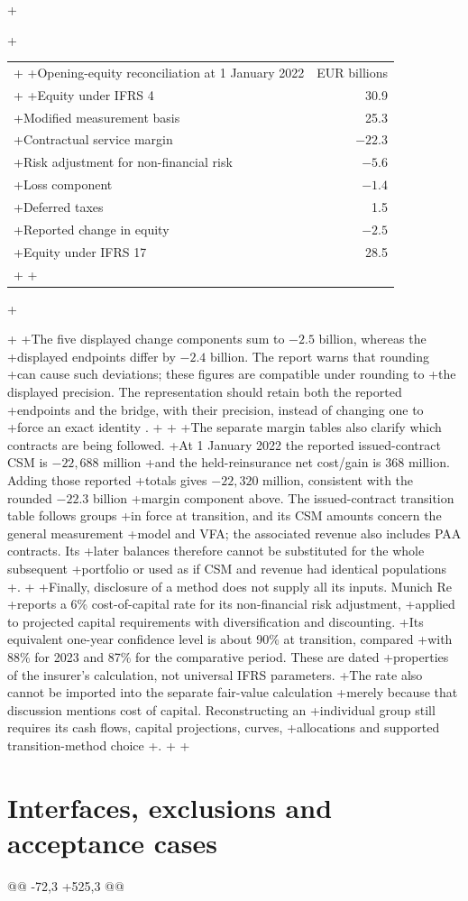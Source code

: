 +\begin{center}
+\begin{tabular}{lr}
+\toprule
+Opening-equity reconciliation at 1 January 2022 & EUR billions \\
+\midrule
+Equity under IFRS 4 & 30.9 \\
+Modified measurement basis & 25.3 \\
+Contractual service margin & $-22.3$ \\
+Risk adjustment for non-financial risk & $-5.6$ \\
+Loss component & $-1.4$ \\
+Deferred taxes & 1.5 \\
+Reported change in equity & $-2.5$ \\
+Equity under IFRS 17 & 28.5 \\
+\bottomrule
+\end{tabular}
+\end{center}
+
+The five displayed change components sum to $-2.5$ billion, whereas the
+displayed endpoints differ by $-2.4$ billion. The report warns that rounding
+can cause such deviations; these figures are compatible under rounding to
+the displayed precision. The representation should retain both the reported
+endpoints and the bridge, with their precision, instead of changing one to
+force an exact identity \citep[pp.~1, 155 and 184]{munichre2023annual}.
+
+\clearpage
+The separate margin tables also clarify which contracts are being followed.
+At 1 January 2022 the reported issued-contract CSM is $-22{,}688$ million
+and the held-reinsurance net cost/gain is $368$ million. Adding those reported
+totals gives $-22{,}320$ million, consistent with the rounded $-22.3$ billion
+margin component above. The issued-contract transition table follows groups
+in force at transition, and its CSM amounts concern the general measurement
+model and VFA; the associated revenue also includes PAA contracts. Its
+later balances therefore cannot be substituted for the whole subsequent
+portfolio or used as if CSM and revenue had identical populations
+\citep[pp.~210--211 and 254--255]{munichre2023annual}.
+
+Finally, disclosure of a method does not supply all its inputs. Munich Re
+reports a 6\% cost-of-capital rate for its non-financial risk adjustment,
+applied to projected capital requirements with diversification and discounting.
+Its equivalent one-year confidence level is about 90\% at transition, compared
+with 88\% for 2023 and 87\% for the comparative period. These are dated
+properties of the insurer's calculation, not universal IFRS parameters.
+The rate also cannot be imported into the separate fair-value calculation
+merely because that discussion mentions cost of capital. Reconstructing an
+individual group still requires its cash flows, capital projections, curves,
+allocations and supported transition-method choice
+\citep[pp.~165, 183 and 185]{munichre2023annual}.
+
+\clearpage
 \hypertarget{interfaces-exclusions-and-acceptance-cases}{%
 \section{Interfaces, exclusions and acceptance cases}\label{method-insurance-methods-interfaces-exclusions-and-acceptance-cases}}
@@ -72,3 +525,3 @@

